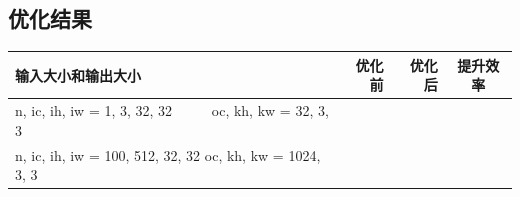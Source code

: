 \documentclass[UTF8]{article}
\begin{document}
\subsection*{优化结果}
\begin{table}[H]
    \begin{tabular}{m{17em}rrc}
        \toprule
        输入大小和输出大小 & 优化前 & 优化后 & 提升效率 \\
        \midrule
        \ttfamily
        n, ic, ih, iw = 1, 3, 32, 32~~~~~
        oc, kh, kw = 32, 3, 3
        & & & \\
        \hline
        \ttfamily
        n, ic, ih, iw = 100, 512, 32, 32
        oc, kh, kw = 1024, 3, 3
        & & & \\
        \bottomrule
    \end{tabular}
\end{table}



\end{document}
